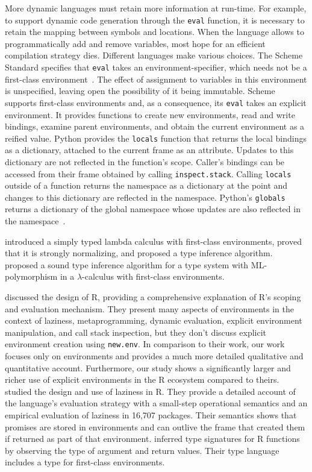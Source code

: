 \documentclass[10pt,review,sigplan,authorversion=true]{acmart}
\newcommand{\code}[1]{\lstinline |#1|\xspace}
\renewcommand{\c}[1]{\lstinline |#1|\xspace}
\begin{document}
More dynamic languages must retain more information at run-time. For example, to
support dynamic code generation through the \c{eval} function, it is necessary
to retain the mapping between symbols and locations. When the language allows to
programmatically add and remove variables, most hope for an efficient
compilation strategy dies. Different languages make various choices. The Scheme
Standard specifies that \code{eval} takes an environment-specifier, which needs
not be a first-class environment~\cite{SchemeR5RS}. The effect of assignment to
variables in this environment is unspecified, leaving open the possibility of it
being immutable. Scheme supports first-class environments and, as a consequence,
its \code{eval} takes an explicit environment. It provides functions to create
new environments, read and write bindings, examine parent environments, and
obtain the current environment as a reified value. Python provides the
\code{locals} function that returns the local bindings as a dictionary, attached
to the current frame as an attribute. Updates to this dictionary are not
reflected in the function's scope. Caller's bindings can be accessed from their
frame obtained by calling \code{inspect.stack}. Calling \code{locals} outside of
a function returns the namespace as a dictionary at the point and changes to
this dictionary are reflected in the namespace. Python's \code{globals} returns
a dictionary of the global namespace whose updates are also reflected in the
namespace~\cite{}.

\citet{NishizakiSTLC94} introduced a simply typed lambda calculus with
first-class environments, proved that it is strongly normalizing, and proposed a
type inference algorithm. \citet{NishizakiML94} proposed a sound type inference
algorithm for a type system with ML-polymorphism in a $\lambda$-calculus with
first-class environments.

\citet{ecoop12} discussed the design of R, providing a comprehensive explanation
of R's scoping and evaluation mechanism. They present many aspects of
environments in the context of laziness, metaprogramming, dynamic evaluation,
explicit environment manipulation, and call stack inspection, but they don't
discuss explicit environment creation using \code{new.env}. In comparison to
their work, our work focuses only on environments and provides a much more
detailed qualitative and quantitative account. Furthermore, our study shows a
significantly larger and richer use of explicit environments in the R ecosystem
compared to theirs. \citet{oopsla19b} studied the design and use of laziness in
R. They provide a detailed account of the language’s evaluation strategy with a
small-step operational semantics and an empirical evaluation of laziness in
16,707 packages. Their semantics shows that promises are stored in environments
and can outlive the frame that created them if returned as part of that
environment. \citet{oopsla20b} inferred type signatures for R functions by
observing the type of argument and return values. Their type language includes a
type for first-class environments.
\end{document}
